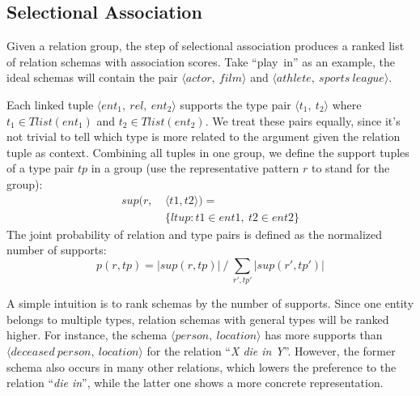 \subsection{Selectional Association}
Given a relation group, the step of selectional association produces
a ranked list of relation schemas with association scores.
Take ``play\ in'' as an example, the ideal schemas will contain the pair
$\langle actor,\ film \rangle$ and
$\langle athlete,\ sports\ league \rangle$.
%

Each linked tuple $\langle ent_1,\ rel,\ ent_2 \rangle$ supports the type pair $\langle t_1,\ t_2 \rangle$
where $t_1 \in Tlist(ent_1)$ and $t_2 \in Tlist(ent_2)$. We treat these pairs equally, since it's not trivial to
tell which type is more related to the argument given the relation tuple as context.
Combining all tuples in one group, we define the support tuples of a type pair $tp$
in a group (use the representative pattern $r$ to stand for the group):
\begin{equation}
\begin{aligned}
sup(r,\ &\langle t1, t2 \rangle) = \\
        &\{ltup : t1 \in ent1,\ t2 \in ent2 \}
\end{aligned}
\end{equation}
\noindent
The joint probability of relation and type pairs is defined as the normalized number of supports:
\begin{equation}
p(r, tp) = |sup(r, tp)|\ /\ \sum\limits_{r', tp'} |sup(r', tp')|
\end{equation}

A simple intuition is to rank schemas by the number of supports.
Since one entity belongs to multiple types, relation schemas with general types
will be ranked higher. For instance, the schema $\langle person,\ location \rangle$
has more supports than $\langle deceased\ person,\ location \rangle$ for the relation ``\textit{X die in Y}''.
However, the former schema also occurs in many other relations, which lowers the preference
to the relation ``\textit{die in}'', while the latter one shows a more concrete representation.


